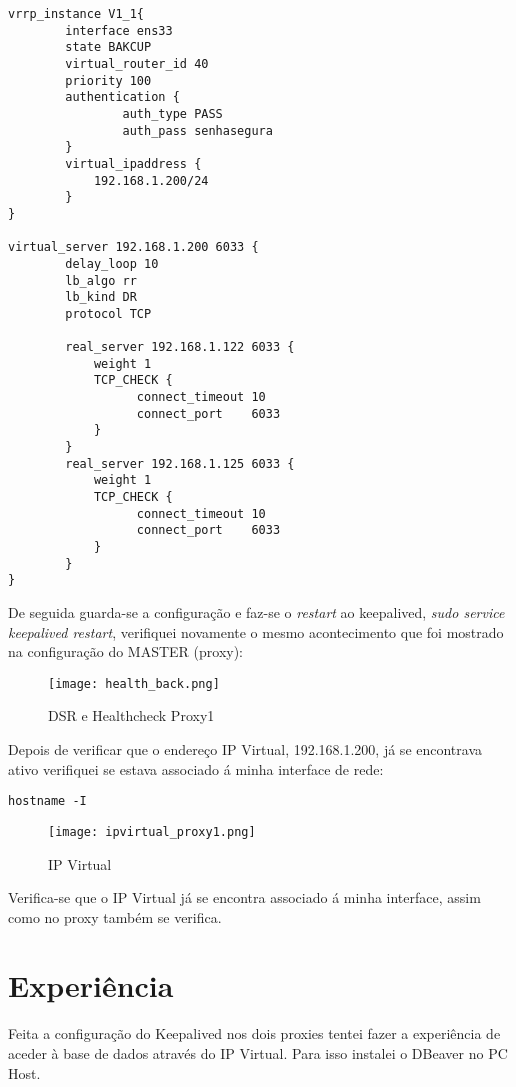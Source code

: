 \begin{verbatim}vrrp_instance V1_1{
    	interface ens33
    	state BAKCUP
    	virtual_router_id 40
    	priority 100
    	authentication {
        		auth_type PASS
        		auth_pass senhasegura
    	}	
    	virtual_ipaddress {
    		192.168.1.200/24 
    	}
}

virtual_server 192.168.1.200 6033 {
        delay_loop 10
        lb_algo rr
        lb_kind DR
        protocol TCP
    
        real_server 192.168.1.122 6033 {
            weight 1
            TCP_CHECK {
                  connect_timeout 10
                  connect_port    6033
            }
        }
        real_server 192.168.1.125 6033 {
            weight 1
            TCP_CHECK {
                  connect_timeout 10
                  connect_port    6033
            }
        }
}\end{verbatim}

\hfill \break
\indent De seguida guarda-se a configuração e faz-se o \textit{restart} ao keepalived, \textit{sudo service keepalived restart}, verifiquei novamente o mesmo acontecimento que foi mostrado na configuração do MASTER (proxy):

\begin{figure}[H]
\center
\texttt{[image: health\_back.png]}
\caption{DSR e Healthcheck Proxy1}
\end{figure}

Depois de verificar que o endereço \ac{IP} Virtual, 192.168.1.200, já se encontrava ativo verifiquei se estava associado á minha interface de rede:

\begin{verbatim}hostname -I\end{verbatim}

\begin{figure}[H]
\center
\texttt{[image: ipvirtual\_proxy1.png]}
\caption{IP Virtual}
\end{figure}

Verifica-se que o IP Virtual já se encontra associado á minha interface, assim como no proxy também se verifica.

\newpage
\section{Experiência}
Feita a configuração do Keepalived nos dois proxies tentei fazer a experiência de aceder à base de dados através do \ac{IP} Virtual. Para isso instalei o DBeaver no \ac{PC} Host.

